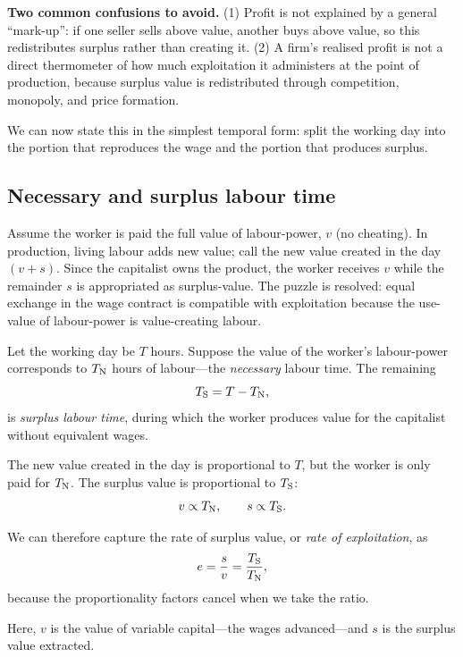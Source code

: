 \noindent
\textbf{Two common confusions to avoid.} (1) Profit is not explained by a general ``mark-up'': if one seller sells
above value, another buys above value, so this redistributes surplus rather than creating it. (2) A firm’s realised
profit is not a direct thermometer of how much exploitation it administers at the point of production, because
surplus value is redistributed through competition, monopoly, and price formation.


\medskip

We can now state this in the simplest temporal form: split the working day into the portion that
reproduces the wage and the portion that produces surplus.

\medskip

\subsection{Necessary and surplus labour time}

Assume the worker is paid the full value of labour-power, $v$ (no cheating). In
production, living labour adds new value; call the new value created in the day
$(v+s)$. Since the capitalist owns the product, the worker receives $v$ while the
remainder $s$ is appropriated as surplus-value. The puzzle is resolved: equal
exchange in the wage contract is compatible with exploitation because the use-value
of labour-power is value-creating labour.

Let the working day be $T$ hours. Suppose the value of the worker’s labour-power
corresponds to $T_{\mathrm{N}}$ hours of labour---the \emph{necessary} labour time. The
remaining
\begin{equation}
  T_{\mathrm{S}} = T - T_{\mathrm{N}},
  \label{eq:Ts}
\end{equation}
is \emph{surplus labour time}, during which the worker produces value for the
capitalist without equivalent wages.

The new value created in the day is proportional to $T$, but the worker is only
paid for $T_{\mathrm{N}}$. The surplus value is proportional to $T_{\mathrm{S}}$:
\[
  v \propto T_{\mathrm{N}},
  \qquad
  s \propto T_{\mathrm{S}}.
\]

We can therefore capture the rate of surplus value, or \emph{rate of
exploitation}, as
\begin{equation}
  e = \frac{s}{v} = \frac{T_{\mathrm{S}}}{T_{\mathrm{N}}},
  \label{eq:exploitation-time}
\end{equation}
because the proportionality factors cancel when we take the ratio.

Here, $v$ is the value of variable capital---the wages advanced---and $s$ is the
surplus value extracted.


